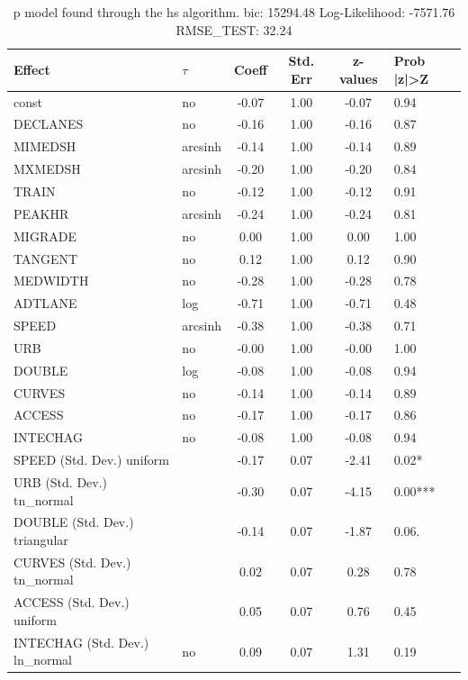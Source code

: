 \begin{table}
	\caption{p model found through the hs algorithm. bic: 15294.48 Log-Likelihood: -7571.76 RMSE_TEST: 32.24}
	\begin{center}
		\begin{tabular}{|l|l|c|c|c|l|}
			\hline
			Effect & $\tau$ & Coeff & Std. Err & z-values & Prob |z|>Z \\
			\hline
			const & no & -0.07 & 1.00 & -0.07 & 0.94 \\
			\hline
			DECLANES & no & -0.16 & 1.00 & -0.16 & 0.87 \\
			\hline
			MIMEDSH & arcsinh & -0.14 & 1.00 & -0.14 & 0.89 \\
			\hline
			MXMEDSH & arcsinh & -0.20 & 1.00 & -0.20 & 0.84 \\
			\hline
			TRAIN & no & -0.12 & 1.00 & -0.12 & 0.91 \\
			\hline
			PEAKHR & arcsinh & -0.24 & 1.00 & -0.24 & 0.81 \\
			\hline
			MIGRADE & no & 0.00 & 1.00 & 0.00 & 1.00 \\
			\hline
			TANGENT & no & 0.12 & 1.00 & 0.12 & 0.90 \\
			\hline
			MEDWIDTH & no & -0.28 & 1.00 & -0.28 & 0.78 \\
			\hline
			ADTLANE & log & -0.71 & 1.00 & -0.71 & 0.48 \\
			\hline
			SPEED & arcsinh & -0.38 & 1.00 & -0.38 & 0.71 \\
			\hline
			URB & no & -0.00 & 1.00 & -0.00 & 1.00 \\
			\hline
			DOUBLE & log & -0.08 & 1.00 & -0.08 & 0.94 \\
			\hline
			CURVES & no & -0.14 & 1.00 & -0.14 & 0.89 \\
			\hline
			ACCESS & no & -0.17 & 1.00 & -0.17 & 0.86 \\
			\hline
			INTECHAG & no & -0.08 & 1.00 & -0.08 & 0.94 \\
			\hline
			SPEED (Std. Dev.) uniform &  & -0.17 & 0.07 & -2.41 & 0.02* \\
			\hline
			URB (Std. Dev.) tn_normal &  & -0.30 & 0.07 & -4.15 & 0.00*** \\
			\hline
			DOUBLE (Std. Dev.) triangular &  & -0.14 & 0.07 & -1.87 & 0.06. \\
			\hline
			CURVES (Std. Dev.) tn_normal &  & 0.02 & 0.07 & 0.28 & 0.78 \\
			\hline
			ACCESS (Std. Dev.) uniform &  & 0.05 & 0.07 & 0.76 & 0.45 \\
			\hline
			INTECHAG (Std. Dev.) ln_normal & no & 0.09 & 0.07 & 1.31 & 0.19 \\

\end{tabular}
\end{center}
\end{table}
